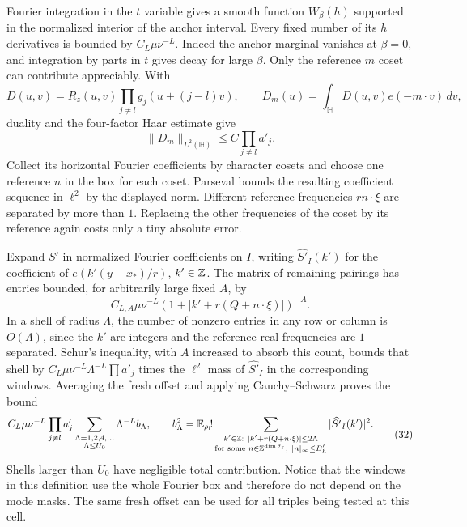 Fourier integration in the $t$ variable gives a smooth function
$W_\beta(h)$ supported in the normalized interior of the anchor
interval.  Every fixed number of its $h$ derivatives is bounded by
$C_L\mu\nu^{-L}$.  Indeed the anchor marginal vanishes at $\beta=0$,
and integration by parts in $t$ gives decay for large $\beta$.
Only the reference $m$ coset can contribute appreciably.  With
\[
 D(u,v)=R_z(u,v)\prod_{j\ne l}g_j(u+(j-l)v),\qquad
 D_m(u)=\int_{\mathbb H}D(u,v)e(-m\cdot v)\,dv,
\]
duality and the four-factor Haar estimate give
\[
 \|D_m\|_{L^2(\mathbb H)}\leq C\prod_{j\ne l}a'_j.
\]
Collect its horizontal Fourier coefficients by character cosets and
choose one reference $n$ in the box for each coset.  Parseval bounds
the resulting coefficient sequence in $\ell^2$ by the displayed norm.
Different reference frequencies $r n\cdot\xi$ are separated by more
than $1$.  Replacing the other frequencies of the coset by its
reference again costs only a tiny absolute error.

Expand $S'$ in normalized Fourier coefficients on $I$, writing
$\widehat{S'}_I(k')$ for the coefficient of
$e(k'(y-x_*)/r)$, $k'\in\mathbb Z$.  The matrix of remaining pairings has
entries bounded, for arbitrarily large fixed $A$, by
\[
 C_{L,A}\mu\nu^{-L}
       (1+|k'+r(Q+n\cdot\xi)|)^{-A}.
\]
In a shell of radius $\Lambda$, the number of nonzero entries in any
row or column is $O(\Lambda)$, since the $k'$ are integers and the
reference real frequencies are $1$-separated.  Schur's inequality,
with $A$ increased to absorb this count, bounds that shell by
$C_L\mu\nu^{-L}\Lambda^{-L}\prod a'_j$ times the $\ell^2$ mass of
$\widehat{S'}_I$ in the corresponding windows.  Averaging the fresh
offset and applying Cauchy--Schwarz proves the bound
\begin{equation*}
 \begin{split}
 C_L\mu\nu^{-L}\prod_{j\ne l}a'_j
       \sum_{\substack{\Lambda=1,2,4,\ldots\\\Lambda\leq U_0}}
             \Lambda^{-L}b_\Lambda,\qquad
 b_\Lambda^2
 =\mathbb E_{\rho_l}\!!
 \sum_{\substack{k'\in\mathbb Z:\
       |k'+r(Q+n\cdot\xi)|\leq2\Lambda\\
       \text{for some }n\in\mathbb Z^{\dim\theta_z},\ |n|_\infty\leq B'_h}}
       |\widehat{S'}_I(k')|^2.
 \end{split}
 \tag{32}\label{eq:src-32}
\end{equation*}
Shells larger than $U_0$ have negligible total contribution.  Notice
that the windows in this definition use the whole Fourier box and
therefore do not depend on the mode masks.  The same fresh offset can
be used for all triples being tested at this cell.

